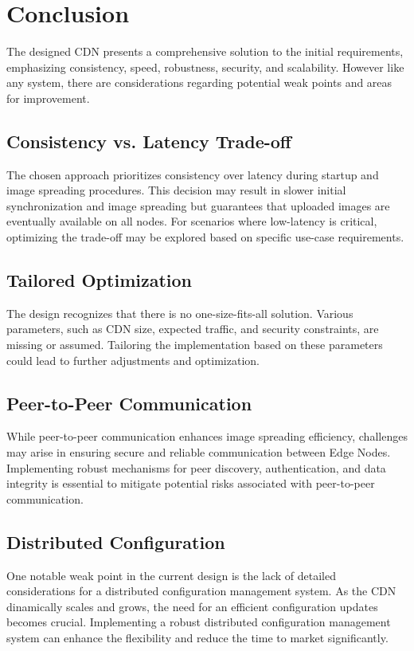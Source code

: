 \documentclass{article}
\begin{document}
  \section{Conclusion}

  The designed CDN presents a comprehensive solution to the initial
  requirements, emphasizing consistency, speed, robustness, security, and scalability.
  However like any system, there are considerations regarding potential weak points and areas for improvement.

  \subsection{Consistency vs. Latency Trade-off}
  The chosen approach prioritizes consistency over latency during startup and image spreading procedures.
  This decision may result in slower initial synchronization and image spreading but guarantees that uploaded
  images are eventually available on all nodes. For scenarios where low-latency is critical,
  optimizing the trade-off may be explored based on specific use-case requirements.

  \subsection{Tailored Optimization}
  The design recognizes that there is no one-size-fits-all solution. Various parameters,
  such as CDN size, expected traffic, and security constraints, are missing or assumed.
  Tailoring the implementation based on these parameters could lead to further adjustments and optimization.

  \subsection{Peer-to-Peer Communication}
  While peer-to-peer communication enhances image spreading efficiency,
  challenges may arise in ensuring secure and reliable communication between Edge Nodes.
  Implementing robust mechanisms for peer discovery, authentication, and data integrity is
  essential to mitigate potential risks associated with peer-to-peer communication.

  \subsection{Distributed Configuration}
  One notable weak point in the current design is the lack of detailed considerations for a
  distributed configuration management system. As the CDN dinamically scales and grows, the need for
  an efficient configuration updates becomes crucial. Implementing a robust distributed configuration
  management system can enhance the flexibility and reduce the time to market significantly.
\end{document}
